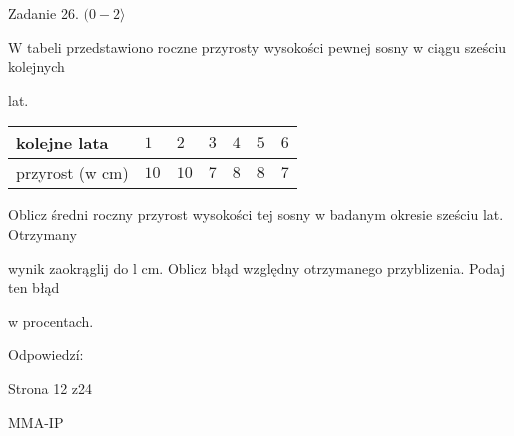\documentclass[a4paper,12pt]{article}
\begin{document}
Zadanie 26. $(0-2\rangle$

$\mathrm{W}$ tabeli przedstawiono roczne przyrosty wysokości pewnej sosny w ciągu sześciu kolejnych

lat.
\begin{center}
\begin{tabular}{|l|l|l|l|l|l|l|}
\hline
\multicolumn{1}{|l|}{kolejne lata}&	\multicolumn{1}{|l|}{$1$}&	\multicolumn{1}{|l|}{ $2$}&	\multicolumn{1}{|l|}{ $3$}&	\multicolumn{1}{|l|}{ $4$}&	\multicolumn{1}{|l|}{ $5$}&	\multicolumn{1}{|l|}{ $6$}	\\
\hline
\multicolumn{1}{|l|}{przyrost (w cm)}&	\multicolumn{1}{|l|}{$10$}&	\multicolumn{1}{|l|}{ $10$}&	\multicolumn{1}{|l|}{ $7$}&	\multicolumn{1}{|l|}{ $8$}&	\multicolumn{1}{|l|}{ $8$}&	\multicolumn{1}{|l|}{ $7$}	\\
\hline
\end{tabular}

\end{center}
Oblicz średni roczny przyrost wysokości tej sosny w badanym okresie sześciu lat. Otrzymany

wynik zaokrąglij do l cm. Oblicz błąd względny otrzymanego przyblizenia. Podaj ten błąd

w procentach.

Odpowiedzí:

Strona 12 z24

MMA-IP
\end{document}
